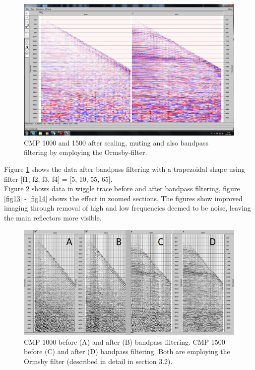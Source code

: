 \documentclass[10pt,a4paper]{article}
\begin{document}
\begin{figure}[H]
\includegraphics[width=\textwidth, trim={1.5cm 1.5cm 1cm 1.5cm},clip]{fig11.jpg}
\caption{CMP 1000 and 1500 after scaling, muting and also bandpass filtering by employing the Ormsby-filter.}
\label{fig11}
\end{figure}

\noindent Figure \ref{fig11} shows the data after bandpass filtering with a trapezoidal shape using filter [f1, f2, f3, f4] = [5, 10, 55, 65].
\\
Figure \ref{fig12} shows data in wiggle trace before and after bandpass filtering, figure \ref{fig13} - \ref{fig14} shows the effect in zoomed sections. The figures show improved imaging through removal of high and low frequencies deemed to be noise, leaving the main reflectors more visible.

\begin{figure}[H]
\includegraphics[width=\textwidth]{fig12.jpg}
\caption{CMP 1000 before (A) and after (B) bandpass filtering. CMP 1500 before (C) and after (D) bandpass filtering. Both are employing the Ormsby filter (described in detail in section 3.2).}
\label{fig12}
\end{figure}
\end{document}
